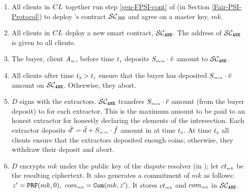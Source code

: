 \begin{enumerate}


\item\label{e-psi::call-F-PSI-stepOne}  All clients in ${CL}$ together run step \ref{gen-FPSI-cont} of \fpsi (in Section \ref{Fair-PSI-Protocol}) to deploy \fpsi's contract $\mathcal{SC}_{\mathtt{JUS}}$ and agree on a  master key, $mk$. 

\item\label{e-psi::deploy-SC-E-PSI} All clients in ${CL}$  deploy a new smart contract, $\mathcal{SC}_{\mathtt{ANE}}$. The address of $\mathcal{SC}_{\mathtt{ANE}}$ is given to all clients. 

\item The buyer, client $ { A}_{\scriptscriptstyle {  m}}$, before time $t_{\scriptscriptstyle 1}$ deposits $S_{\scriptscriptstyle min}\cdot \ddot{v}$  amount to $\mathcal{SC}_{\mathtt{ANE}}$. 
\item\label{e-PSI::buyer-deposit} All clients after  time $t_{\scriptscriptstyle 2}>t_{\scriptscriptstyle 1}$ ensure that the buyer has deposited $S_{\scriptscriptstyle min}\cdot \ddot{v}$ amount on $\mathcal{SC}_{\mathtt{ANE}}$. Otherwise, they abort.



\item\label{e-PSI::extractor-deposit} $D$ signs \SCpc with the extractors. $\mathcal{SC}_{\mathtt{ANE}}$ transfers $S_{\scriptscriptstyle min}\cdot \ddot{r}$ amount (from the buyer deposit) to \SCpc for each extractor. This is the maximum amount to be paid to an honest extractor for honestly declaring the elements of the intersection. %
%
Each extractor  deposits $\ddot{d}'=\ddot{d}+S_{\scriptscriptstyle min}\cdot \ddot{f}$ amount in \SCpc at time $t_{\scriptscriptstyle 3}$. At time $t_{\scriptscriptstyle 4}$ all clients ensure that the extractors deposited enough coins; otherwise, they withdraw their deposit and abort. 

%
\item\label{e-psi::commit-to-mk} $D$ encrypts $mk$ under the public key of the dispute resolver (in \SCpc); let $ct_{\scriptscriptstyle mk}$ be the resulting ciphertext.  It also generates a commitment of $mk$ as follows: $z'=\mathtt{PRF}(mk, 0),\ com_{\scriptscriptstyle mk}=\mathtt{Com}(mk, z')$. It stores $ct_{\scriptscriptstyle mk}$  and ${com}_{\scriptscriptstyle mk}$ in $\mathcal{SC}_{\mathtt{ANE}}$. 



\end{enumerate}
